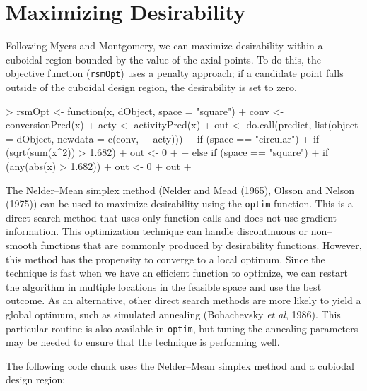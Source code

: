 \documentclass[12pt]{article}
\begin{document}
\clearpage
\section{Maximizing Desirability}

Following Myers and Montgomery, we can maximize desirability within a cuboidal region bounded by the value of the axial points. To do this, the objective function (\texttt{rsmOpt}) uses a penalty approach; if a candidate point falls outside of the cuboidal design region, the desirability is set to zero. 

{\small
\begin{Schunk}
\begin{Sinput}
> rsmOpt <- function(x, dObject, space = "square") {
+     conv <- conversionPred(x)
+     acty <- activityPred(x)
+     out <- do.call(predict, list(object = dObject, newdata = c(conv, 
+         acty)))
+     if (space == "circular") {
+         if (sqrt(sum(x^2)) > 1.682) 
+             out <- 0
+     }
+     else if (space == "square") 
+         if (any(abs(x) > 1.682)) 
+             out <- 0
+     out
+ }
\end{Sinput}
\end{Schunk}
}

The Nelder--Mean simplex method (Nelder and Mead (1965), Olsson and Nelson (1975)) can be used to maximize desirability using the \texttt{optim} function. This is a direct search method that uses only function calls and does not use gradient information. This optimization technique can handle discontinuous or non--smooth functions that are commonly produced by desirability functions. However, this method has the propensity to converge to a local optimum. Since the technique is fast when we have an efficient function to optimize, we can restart the algorithm in multiple locations in the feasible space and use the best outcome. As an alternative, other direct search methods are more likely to yield a global optimum, such as simulated annealing (Bohachevsky {\it et al}, 1986). This particular routine is also available in \texttt{optim}, but tuning the annealing parameters may be needed to ensure that the technique is performing well.

The following code chunk uses the Nelder--Mean simplex method and a cubiodal design region:
\end{document}
